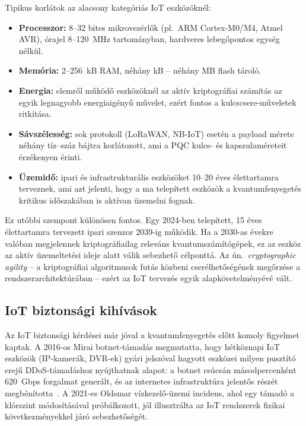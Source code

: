 Tipikus korlátok az alacsony kategóriás IoT eszközöknél:
\begin{itemize}
    \item \textbf{Processzor:} 8--32 bites mikrovezérlők (pl.\ ARM Cortex-M0/M4, Atmel AVR),
          órajel 8--120~MHz tartományban, hardveres lebegőpontos egység nélkül.
    \item \textbf{Memória:} 2--256~kB RAM, néhány kB -- néhány MB flash tároló.
    \item \textbf{Energia:} elemről működő eszközöknél az aktív kriptográfiai számítás az egyik
          legnagyobb energiaigényű művelet, ezért fontos a kulcscsere-műveletek ritkítása.
    \item \textbf{Sávszélesség:} sok protokoll (LoRaWAN, NB-IoT) esetén a payload mérete
          néhány tíz--száz bájtra korlátozott, ami a PQC kulcs- és kapszulaméreteit
          érzékenyen érinti.
    \item \textbf{Üzemidő:} ipari és infrastrukturális eszközöket 10--20 éves élettartamra
          terveznek, ami azt jelenti, hogy a ma telepített eszközök a kvantumfenyegetés
          kritikus időszakában is aktívan üzemelni fognak.
\end{itemize}

Ez utóbbi szempont különösen fontos. Egy 2024-ben telepített, 15 éves élettartamra tervezett
ipari szenzor 2039-ig működik. Ha a 2030-as évekre valóban megjelennek kriptográfiailag releváns
kvantumszámítógépek, ez az eszköz az aktív üzemeltetési ideje alatt válik sebezhető célponttá.
Az ún.\ \textit{cryptographic agility} -- a kriptográfiai algoritmusok futás közbeni cserélhetőségének
megőrzése a rendszerarchitektúrában -- ezért az IoT tervezés egyik alapkövetelményévé vált.

\subsection{IoT biztonsági kihívások}

Az IoT biztonsági kérdései már jóval a kvantumfenyegetés előtt komoly figyelmet kaptak. A 2016-os
Mirai botnet-támadás megmutatta, hogy hétköznapi IoT eszközök (IP-kamerák, DVR-ek) gyári
jelszóval hagyott eszközei milyen pusztító erejű DDoS-támadáshoz nyújthatnak alapot: a
botnet csúcsán másodpercenként 620~Gbps forgalmat generált, és az internetes infrastruktúra
jelentős részét megbénította~\cite{mirai2016}. A 2021-es Oldsmar vízkezelő-üzemi incidens, ahol
egy támadó a klórszint módosításával próbálkozott, jól illusztrálta az IoT rendszerek fizikai
következményekkel járó sebezhetőségét.

